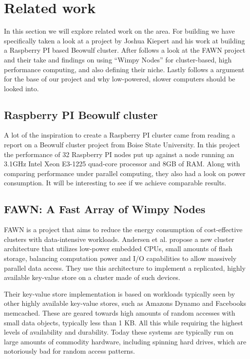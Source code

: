 \clearpage
\section{Related work}
\label{sec:related}
In this section we will explore related work on the area. For building we have specifically taken a look at a project by Joshua Kiepert and his work at building a Raspberry PI based Beowulf cluster.
After follows a look at the FAWN project and their take and findings on using ``Wimpy Nodes'' for cluster-based, high performance computing, and also defining their niche.
Lastly follows a argument for the base of our project and why low-powered, slower computers should be looked into.

\subsection{Raspberry PI Beowulf cluster}
A lot of the inspiration to create a Raspberry PI cluster came from reading a report on a Beowulf cluster project from Boise State University.\cite{RPI_BEOWULF} In this project the performance of 32 Raspberry PI nodes put up against a node running an 3.1GHz Intel Xeon E3-1225 quad-core processor and 8GB of RAM. Along with comparing performance under parallel computing, they also had a look on power consumption. It will be interesting to see if we achieve comparable results. 

\subsection{FAWN: A Fast Array of Wimpy Nodes}
FAWN\cite{fawn} is a project that aims to reduce the energy consumption of cost-effective clusters with data-intensive workloads. 
Andersen et al. propose a new cluster architecture that utilizes low-power embedded CPUs, small amounts of flash storage, balancing computation power and I/O capabilities to allow massively parallel data access.
They use this architecture to implement a replicated, highly available key-value store on a cluster made of such devices.

Their key-value store implementation is based on workloads typically seen by other highly available key-value stores, such as Amazons Dynamo and Facebooks memcached. These are geared towards high amounts of random accesses with small data objects, typically less than 1 KB. All this while requiring the highest levels of availability and durability.
Today these systems are typically run on large amounts of commodity hardware, including spinning hard drives, which are notoriously bad for random access patterns.

